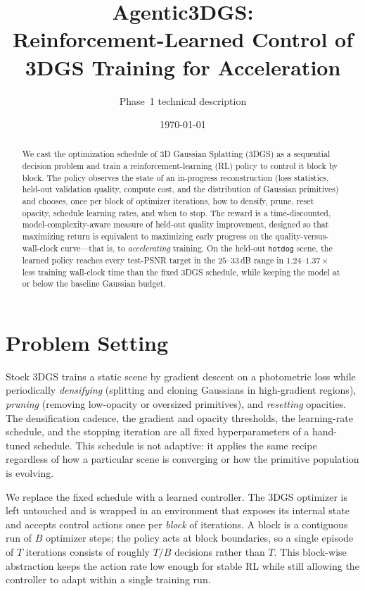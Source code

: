 \documentclass[11pt]{article}
\title{Agentic3DGS:\\
Reinforcement-Learned Control of 3DGS Training for Acceleration}
\author{Phase~1 technical description}
\date{\today}
\begin{document}
\maketitle

\begin{abstract}
We cast the optimization schedule of 3D Gaussian Splatting (3DGS) as a sequential
decision problem and train a reinforcement-learning (RL) policy to control it
block by block. The policy observes the state of an in-progress reconstruction
(loss statistics, held-out validation quality, compute cost, and the distribution
of Gaussian primitives) and chooses, once per block of optimizer iterations, how
to densify, prune, reset opacity, schedule learning rates, and when to stop. The
reward is a time-discounted, model-complexity-aware measure of held-out quality
improvement, designed so that maximizing return is equivalent to maximizing early
progress on the quality-versus-wall-clock curve---that is, to \emph{accelerating}
training. On the held-out \texttt{hotdog} scene, the learned policy reaches every
test-PSNR target in the $25$--$33$\,dB range in $1.24$--$1.37\times$ less training
wall-clock time than the fixed 3DGS schedule, while keeping the model at or below
the baseline Gaussian budget.
\end{abstract}

\section{Problem Setting}

Stock 3DGS trains a static scene by gradient descent on a photometric loss while
periodically \emph{densifying} (splitting and cloning Gaussians in
high-gradient regions), \emph{pruning} (removing low-opacity or oversized
primitives), and \emph{resetting} opacities. The densification cadence, the
gradient and opacity thresholds, the learning-rate schedule, and the stopping
iteration are all fixed hyperparameters of a hand-tuned schedule. This schedule is
not adaptive: it applies the same recipe regardless of how a particular scene is
converging or how the primitive population is evolving.

We replace the fixed schedule with a learned controller. The 3DGS optimizer is
left untouched and is wrapped in an environment that exposes its internal state
and accepts control actions once per \emph{block} of iterations. A block is a
contiguous run of $B$ optimizer steps; the policy acts at block boundaries, so a
single episode of $T$ iterations consists of roughly $T/B$ decisions rather than
$T$. This block-wise abstraction keeps the action rate low enough for stable RL
while still allowing the controller to adapt within a single training run.
\end{document}

